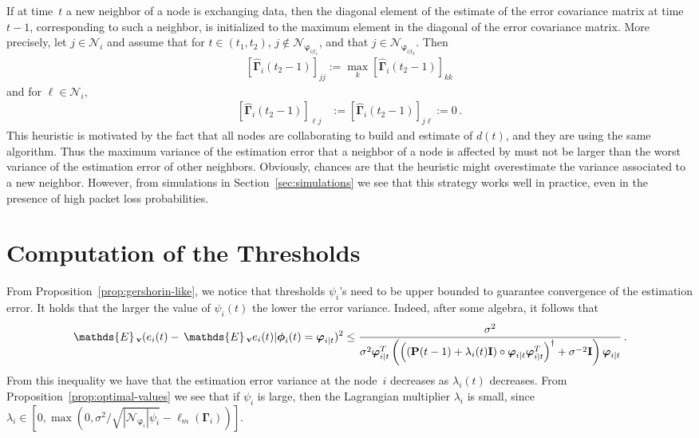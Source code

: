 \documentclass[a4paper,notitlepage,onecolumn]{article}
\def\P{\mathds{P}}
\def\I{{\cal I}}
\def\v{{\bf v}}
\def\I{{\bf I}}
\def\P{{\bf P}}
\def\phib{\boldsymbol{\phi}}
\def\varphib{\boldsymbol{\varphi}}
\def\Gammab{\boldsymbol{\Gamma}}
\def\E{\,\mathds{E}\,}
\numberwithin{equation}{section}
\begin{document}
If at time~$t$ a new neighbor of a node is exchanging data, then
the diagonal element of the estimate of the error covariance
matrix at time $t-1$, corresponding to such a neighbor, is
initialized to the maximum element in the diagonal of the error
covariance matrix. More precisely, let  $j\in \mathcal{N}_i$ and
assume that for $t\in (t_1,t_2)$, $j \notin
\mathcal{N}_{\varphib_{i|t_1}}$, and that $j \in
\mathcal{N}_{\varphib_{i|t_2}}$. Then
\begin{align*}
    \left[\hat{\Gammab}_i(t_2-1)\right]_{jj} := \max_k \left[\hat{\Gammab}_i(t_2-1)\right]_{kk}
\end{align*}
and for $\ell \in \mathcal{N}_i$,
\begin{align*}
    \left[\hat{\Gammab}_i(t_2-1)\right]_{\ell j} & := \left[\hat{\Gammab}_i(t_2-1)\right]_{j \ell} := 0\,.
\end{align*}
This heuristic is motivated by the fact that all nodes are
collaborating to build and estimate of $d(t)$, and they are using
the same algorithm. Thus the maximum variance of the estimation
error that a neighbor of a node is affected by must not be larger
than the worst variance of the estimation error of other
neighbors. Obviously, chances are that the heuristic might
overestimate the variance associated to a new neighbor. However,
from simulations in Section~\ref{sec:simulations} we see that this
strategy works well in practice, even in the presence of high packet loss
probabilities.


\section{Computation of the Thresholds}
\label{sec:computation_of_psi}

From Proposition~\ref{prop:gershorin-like}, we notice that
thresholds $\psi_i$'s need to be upper bounded to guarantee
convergence of the estimation error. It holds that the larger the
value of $\psi_i(t)$ the lower the error variance. Indeed, after
some algebra, it follows that
\begin{align}
   \E_\v (e_i(t) - \E_\v e_i(t) | \phib_i(t)=\varphib_{i|t})^2
\leq \frac{\sigma^2}{\sigma^2\varphib_{i|t}^T  \left(\left((\P(t-1)+\lambda_i(t) \I) \circ \varphib_{i|t}\varphib_{i|t}^T\right)^\dag + \sigma^{-2}
   \I  \right)\varphib_{i|t}}\,.
   \label{eq:optim_value_var}
\end{align}
From this inequality we have that the estimation error variance at
the node~$i$ decreases as $\lambda_i(t)$ decreases. From
Proposition~\ref{prop:optimal-values} we see that if $\psi_i$ is
large, then the Lagrangian multiplier $\lambda_i$ is small, since
$\lambda_i\in  \left[0, \max\left(0,
\sigma^2/\sqrt{|\mathcal{N}_{\varphib_i}| \psi_i} - \ell_m
(\Gammab_i)\right)\right]$.
\end{document}
